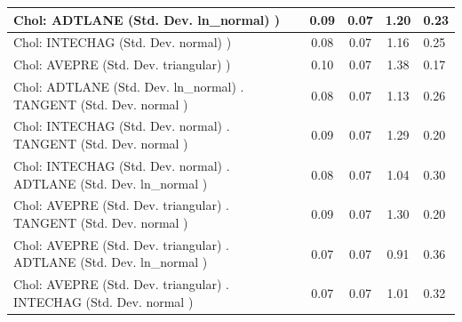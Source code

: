 \begin{table}
\begin{center}
\begin{tabular}{|l|l|c|c|c|l|}
			\hline
			 Chol: ADTLANE (Std. Dev. ln_normal) ) &  & 0.09 & 0.07 & 1.20 & 0.23 \\
			\hline
			 Chol: INTECHAG (Std. Dev. normal) ) &  & 0.08 & 0.07 & 1.16 & 0.25 \\
			\hline
			 Chol: AVEPRE (Std. Dev. triangular) ) &  & 0.10 & 0.07 & 1.38 & 0.17 \\
			\hline
			 Chol: ADTLANE (Std. Dev. ln_normal) . TANGENT (Std. Dev.   normal ) &  & 0.08 & 0.07 & 1.13 & 0.26 \\
			\hline
			 Chol: INTECHAG (Std. Dev. normal) . TANGENT (Std. Dev.   normal ) &  & 0.09 & 0.07 & 1.29 & 0.20 \\
			\hline
			 Chol: INTECHAG (Std. Dev. normal) . ADTLANE (Std. Dev.   ln_normal ) &  & 0.08 & 0.07 & 1.04 & 0.30 \\
			\hline
			 Chol: AVEPRE (Std. Dev. triangular) . TANGENT (Std. Dev.   normal ) &  & 0.09 & 0.07 & 1.30 & 0.20 \\
			\hline
			 Chol: AVEPRE (Std. Dev. triangular) . ADTLANE (Std. Dev.   ln_normal ) &  & 0.07 & 0.07 & 0.91 & 0.36 \\
			\hline
			 Chol: AVEPRE (Std. Dev. triangular) . INTECHAG (Std. Dev.   normal ) &  & 0.07 & 0.07 & 1.01 & 0.32 \\
			\hline
		\end{tabular}
	\end{center}
\end{table}